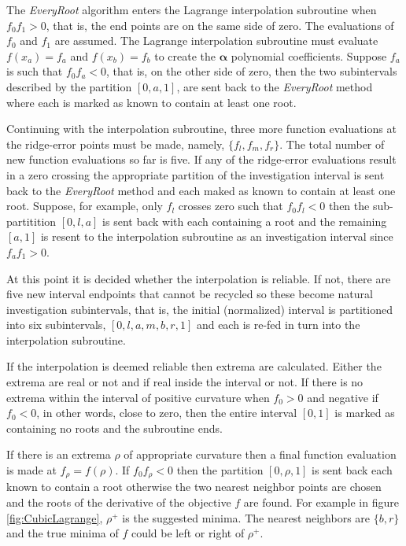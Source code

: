 The \emph{EveryRoot} algorithm enters the Lagrange interpolation subroutine when $f_0f_1>0$, that is, the end points are on the same side of zero. The evaluations of $f_0$ and $f_1$ are assumed. The Lagrange interpolation subroutine must evaluate $f(x_a) = f_a$ and $f(x_b) = f_b$ to create the $\mathbf{\alpha}$ polynomial coefficients. Suppose $f_a$ is such that $f_0f_a < 0$, that is, on the other side of zero, then the two subintervals described by the partition $[0,a,1]$, are sent back to the \emph{EveryRoot} method where each is marked as known to contain at least one root.

Continuing with the interpolation subroutine, three more function evaluations at the ridge-error points must be made, namely, $\{f_l, f_m, f_r\}$. The total number of new function evaluations so far is five. If any of the ridge-error evaluations result in a zero crossing the appropriate partition of the investigation interval is sent back to the \emph{EveryRoot} method and each maked as known to contain at least one root. Suppose, for example, only $f_l$ crosses zero such that $f_0f_l < 0$ then the sub-partitition $[0,l,a]$ is sent back with each containing a root and the remaining $[a,1]$ is resent to the interpolation subroutine as an investigation interval since $f_af_1>0$.

At this point it is decided whether the interpolation is reliable. If not, there are five new interval endpoints that cannot be recycled so these become natural investigation subintervals, that is, the initial (normalized) interval is partitioned into six subintervals, $[0,l, a, m, b, r, 1]$ and each is re-fed in turn into the interpolation subroutine.

If the interpolation is deemed reliable then extrema are calculated. Either the extrema are real or not and if real inside the interval or not. If there is no extrema within the interval of positive curvature when $f_0 > 0$ and negative if $f_0 < 0$, in other words, close to zero, then the entire interval $[0,1]$ is marked as containing no roots and the subroutine ends.

If there is an extrema $\rho$ of appropriate curvature then a final function evaluation is made at $f_{\rho} = f(\rho)$. If $f_0f_{\rho}<0$ then the partition $[0,\rho,1]$ is sent back each known to contain a root otherwise the two nearest neighbor points are chosen and the roots of the derivative of the objective $f$ are found. For example in figure \ref{fig:CubicLagrange}, $\rho^+$  is the suggested minima. The nearest neighbors are $\{b, r\}$ and the true minima of $f$ could be left or right of $\rho^+$. 

